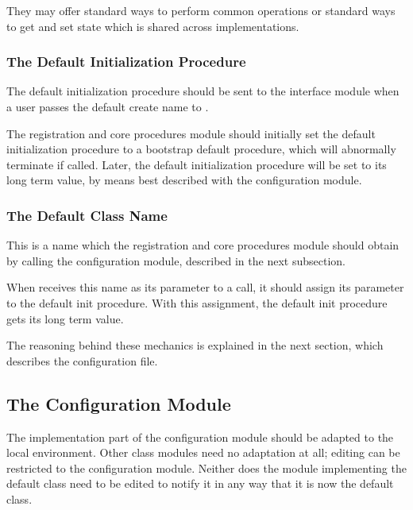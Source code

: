They may offer standard ways to perform common operations or standard
ways to get and set state which is shared across implementations.

\subsubsection{The Default Initialization Procedure}

The default initialization procedure should be sent to the interface module when a user
passes the default create name to .

The registration and core procedures module should initially set the default
initialization procedure to a bootstrap default procedure, which will abnormally
terminate if called.  Later, the default initialization procedure will be set to its
long term value, by means best described with the configuration
module.

\subsubsection{The Default Class Name}

This is a name which the registration and core procedures module should
obtain by calling the configuration module, described in the next subsection.
 
When  receives this name as its  parameter to
a call, it should assign its  parameter to the default init
procedure.  With this assignment, the default init procedure gets its long
term value.

The reasoning behind these mechanics is explained in the next section, which
describes the configuration file.

\subsection{The Configuration Module}

The implementation part of the configuration module should be adapted to 
the local environment.  Other class modules need no adaptation at all;
editing can be restricted to the configuration module.  
Neither does the module implementing the default class need to be edited
to notify it in any way
that it is now the default class.

